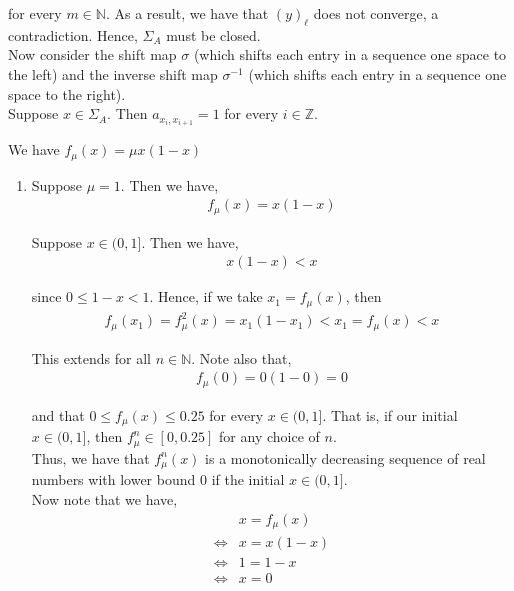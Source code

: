 \documentclass[12pt]{article}
\newenvironment{problem}[2][Problem]{\begin{trivlist}
\item[\hskip \labelsep {\bfseries #1}\hskip \labelsep {\bfseries #2.}]}{\end{trivlist}}
\begin{document}
for every $m \in \mathbb{N}$. As a result, we have that $(y)_{\ell}$ does not converge, a contradiction. Hence, $\Sigma_A$ must be closed.\\

Now consider the shift map $\sigma$ (which shifts each entry in a sequence one space to the left) and the inverse shift map $\sigma^{-1}$ (which shifts each entry in a sequence one space to the right).\\

Suppose $x \in \Sigma_A$. Then $a_{x_{i}, x_{i+1}} = 1$ for every $i \in \mathbb{Z}$.
\newpage
\begin{problem}{3}
\end{problem}

We have $f_{\mu}(x) = \mu x(1 - x)$
\begin{enumerate}[label=(\alph*)]
\item Suppose $\mu = 1$. Then we have,
\begin{align*}
f_{\mu}(x) = x(1 - x)
\end{align*}

Suppose $x \in (0, 1]$. Then we have,
\begin{align*}
x(1-x) < x
\end{align*}

since $0 \leq 1 - x < 1$. Hence, if we take $x_1 = f_{\mu}(x)$, then
\begin{align*}
f_{\mu}(x_1) = f^2_{\mu}(x) = x_1(1 - x_1) <  x_1 = f_{\mu}(x) < x
\end{align*} 

This extends for all $n \in \mathbb{N}$. Note also that,
\begin{align*}
f_{\mu}(0) = 0(1 - 0) = 0
\end{align*}

and that $0 \leq f_{\mu}(x) \leq 0.25$ for every $x \in (0, 1]$. That is, if our initial $x \in (0, 1]$, then $f^n_{\mu} \in [0, 0.25]$ for any choice of $n$.\\

Thus, we have that $f^n_{\mu}(x)$ is a monotonically decreasing sequence of real numbers with lower bound $0$ if the initial $x \in (0, 1]$.\\

Now note that we have,
\begin{align*}
&x = f_{\mu}(x)\\
\iff &x = x(1-x)\\
\iff &1 = 1-x\\
\iff &x = 0
\end{align*}


\end{enumerate}
\end{document}
